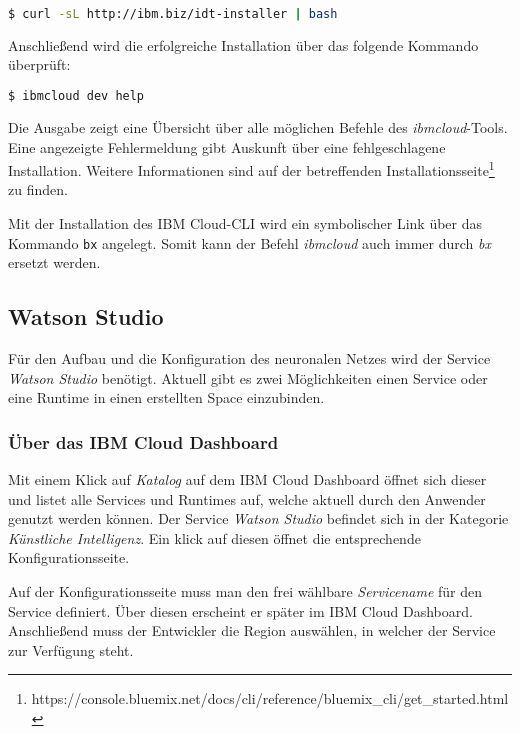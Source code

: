\begin{lstlisting}[language=bash, caption=Installation des IBM Cloud CLI, label=Installation des IBM Cloud CLI]
    $ curl -sL http://ibm.biz/idt-installer | bash
\end{lstlisting}

Anschließend wird die erfolgreiche Installation über das folgende Kommando überprüft:

\begin{lstlisting}[language=bash, caption=Installation des CLI überprüfen, label=Installation des CLI überprüfen]
    $ ibmcloud dev help
\end{lstlisting}

Die Ausgabe zeigt eine Übersicht über alle möglichen Befehle des \textit{ibmcloud}-Tools. Eine angezeigte Fehlermeldung
gibt Auskunft über eine fehlgeschlagene Installation. Weitere Informationen sind auf der betreffenden
Installationsseite\footnote{https://console.bluemix.net/docs/cli/reference/bluemix\_cli/get\_started.html} zu finden.

Mit der Installation des IBM Cloud-CLI wird ein symbolischer Link über das Kommando \texttt{bx} angelegt. Somit kann der
Befehl \textit{ibmcloud} auch immer durch \textit{bx} ersetzt werden.

\subsection{Watson Studio}
Für den Aufbau und die Konfiguration des neuronalen Netzes wird der Service \textit{Watson Studio} benötigt. Aktuell gibt
es zwei Möglichkeiten einen Service oder eine Runtime in einen erstellten Space einzubinden.

\subsubsection*{Über das IBM Cloud Dashboard}
Mit einem Klick auf \textit{Katalog} auf dem IBM Cloud Dashboard öffnet sich dieser und listet alle Services und Runtimes
auf, welche aktuell durch den Anwender genutzt werden können. Der Service \textit{Watson Studio} befindet sich in der
Kategorie \textit{Künstliche Intelligenz}. Ein klick auf diesen öffnet die entsprechende Konfigurationsseite.

Auf der Konfigurationsseite muss man den frei wählbare \textit{Servicename} für den Service definiert. Über diesen
erscheint er später im IBM Cloud Dashboard. Anschließend muss der Entwickler die Region auswählen, in welcher der Service
zur Verfügung steht.

